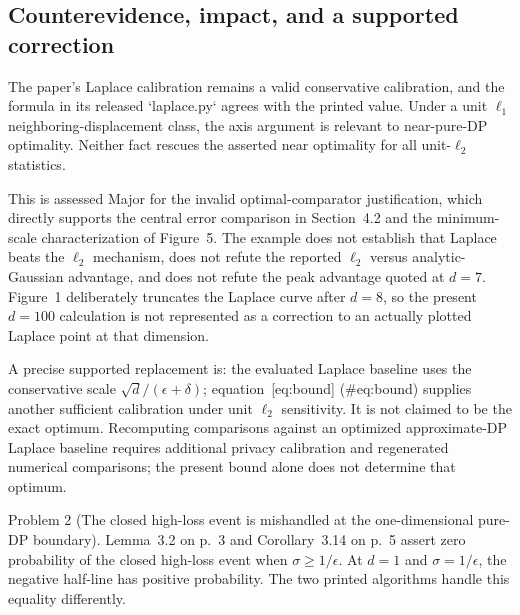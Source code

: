 \documentclass[10pt]{article}
\begin{document}
\subsection*{Counterevidence, impact, and a supported correction}
The paper’s Laplace calibration remains a valid conservative calibration, and the formula in its released `laplace.py` agrees with the printed value. Under a unit \(\ell_1\) neighboring-displacement class, the axis argument is relevant to near-pure-DP optimality. Neither fact rescues the asserted near optimality for all unit-\(\ell_2\) statistics.\par
This is assessed Major for the invalid optimal-comparator justification, which directly supports the central error comparison in Section 4.2 and the minimum-scale characterization of Figure 5. The example does not establish that Laplace beats the \(\ell_2\) mechanism, does not refute the reported \(\ell_2\) versus analytic-Gaussian advantage, and does not refute the peak advantage quoted at \(d=7\). Figure 1 deliberately truncates the Laplace curve after \(d=8\), so the present \(d=100\) calculation is not represented as a correction to an actually plotted Laplace point at that dimension.\par
A precise supported replacement is: the evaluated Laplace baseline uses the conservative scale \(\sqrt d/(\epsilon+\delta)\); equation [eq:bound] (\#eq:bound) supplies another sufficient calibration under unit \(\ell_2\) sensitivity. It is not claimed to be the exact optimum. Recomputing comparisons against an optimized approximate-DP Laplace baseline requires additional privacy calibration and regenerated numerical comparisons; the present bound alone does not determine that optimum.\par
Problem 2 (The closed high-loss event is mishandled at the one-dimensional pure-DP boundary).  Lemma 3.2 on p. 3 and Corollary 3.14 on p. 5 assert zero probability of the closed high-loss event when \(\sigma\geq1/\epsilon\). At \(d=1\) and \(\sigma=1/\epsilon\), the negative half-line has positive probability. The two printed algorithms handle this equality differently.\par
\end{document}
